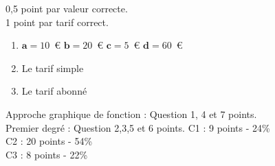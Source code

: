 \documentclass[a4paper, 12pt, parskip=half-]{scrartcl}
\begin{document}
\begin{solution}
    0,5 point par valeur correcte.\\
    1 point par tarif correct.
    \begin{enumerate}
        \item $\bm{a} = 10$~€\hfill
              $\bm{b} = 20$~€\hfill
              $\bm{c} = 5$~€\hfill
              $\bm{d} = 60$~€
        \item Le tarif simple
        \item Le tarif abonné
    \end{enumerate}
\end{solution}
\newpage
\printsolutions
\bigbreak
{}
Approche graphique de fonction : Question 1, 4 et 7  points.\\
Premier degré : Question 2,3,5 et 6  points.
C1 : 9 points - 24\%\\
C2 : 20 points - 54\%\\
C3 : 8 points - 22\%
\end{document}

